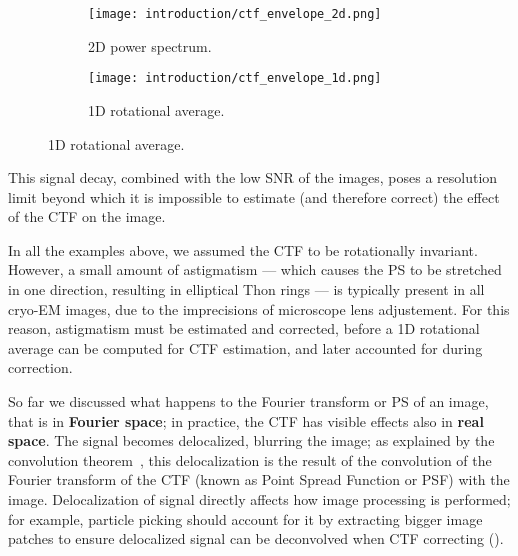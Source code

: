 \begin{figure}
    \centering
    \begin{subfigure}[B]{.42\textwidth}
        \centering
        \texttt{[image: introduction/ctf\_envelope\_2d.png]}
        \caption{2D power spectrum.}
        \label{fig:em_ctf_envelope_2d}
    \end{subfigure}%
    \hfill
    \begin{subfigure}[B]{.55\textwidth}
        \centering
        \texttt{[image: introduction/ctf\_envelope\_1d.png]}
        \caption{1D rotational average.}
        \label{fig:em_ctf_envelope_1d}
    \end{subfigure}%
    \label{fig:em_ctf_envelope}
\end{figure}

This signal decay, combined with the low SNR of the images, poses a resolution limit beyond which it is impossible to estimate (and therefore correct) the effect of the CTF on the image.

In all the examples above, we assumed the CTF to be rotationally invariant.
However, a small amount of astigmatism --- which causes the PS to be stretched in one direction, resulting in elliptical Thon rings --- is typically present in all cryo-EM images, due to the imprecisions of microscope lens adjustement.
For this reason, astigmatism must be estimated and corrected, before a 1D rotational average can be computed for CTF estimation, and later accounted for during correction.

So far we discussed what happens to the Fourier transform or PS of an image, that is in \textbf{Fourier space}; in practice, the CTF has visible effects also in \textbf{real space}.
The signal becomes delocalized, blurring the image; as explained by the convolution theorem~\cite{wikipediaConvolutionTheorem2024}, this delocalization is the result of the convolution of the Fourier transform of the CTF (known as Point Spread Function or PSF) with the image.
Delocalization of signal directly affects how image processing is performed; for example, particle picking should account for it by extracting bigger image patches to ensure delocalized signal can be deconvolved when CTF correcting ().


